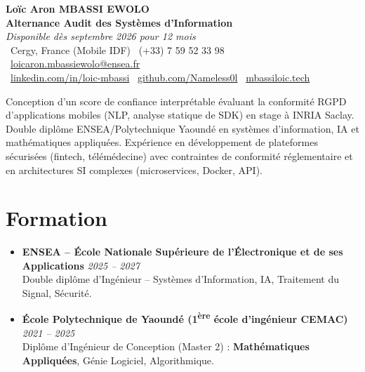 \documentclass[a4paper,11pt]{article}
\begin{document}
\begin{center}
    {\Large \textbf{Loïc Aron MBASSI EWOLO}} \\ \vspace{4pt}
    \textbf{\large Alternance Audit des Systèmes d'Information} \\
    \textit{\small Disponible dès septembre 2026 pour 12 mois} \\ \vspace{4pt}
    \small
    \faMapMarker\ Cergy, France (Mobile IDF) \quad
    \faPhone\ (+33) 7 59 52 33 98 \quad
    {\color{primary}\faEnvelope\ \href{mailto:loicaron.mbassiewolo@ensea.fr}{loicaron.mbassiewolo@ensea.fr}} \\ \vspace{2pt}
    {\color{primary}\faLinkedin\ \href{https://www.linkedin.com/in/loic-mbassi/}{linkedin.com/in/loic-mbassi}} \quad
    {\color{primary}\faGithub\ \href{https://github.com/Nameless0l}{github.com/Nameless0l}} \quad
    {\color{primary}\faGlobe\ \href{https://mbassiloic.tech}{mbassiloic.tech}}
\end{center}

\vspace{-6pt}

\noindent\small{Conception d'un score de confiance interprétable évaluant la conformité RGPD d'applications mobiles (NLP, analyse statique de SDK) en stage à INRIA Saclay. Double diplôme ENSEA/Polytechnique Yaoundé en systèmes d'information, IA et mathématiques appliquées. Expérience en développement de plateformes sécurisées (fintech, télémédecine) avec contraintes de conformité réglementaire et en architectures SI complexes (microservices, Docker, API).}

\section{Formation}
\begin{itemize}[leftmargin=*, label=\tiny$\bullet$, nosep]
    \item \textbf{ENSEA -- École Nationale Supérieure de l'Électronique et de ses Applications} \hfill \textit{2025 -- 2027} \\
    \small{Double diplôme d'Ingénieur -- Systèmes d'Information, IA, Traitement du Signal, Sécurité.}
    \item \textbf{École Polytechnique de Yaoundé (1\textsuperscript{ère} école d'ingénieur CEMAC)} \hfill \textit{2021 -- 2025} \\
    \small{Diplôme d'Ingénieur de Conception (Master 2) : \textbf{Mathématiques Appliquées}, Génie Logiciel, Algorithmique.}
\end{itemize}
\end{document}
